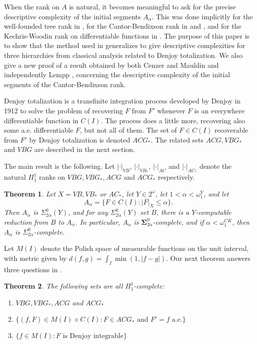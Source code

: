 \documentclass[12pt]{amsart}
\newtheorem{theorem}{Theorem}
\begin{document}
When the rank on $A$ is natural, 
it becomes meaningful to ask for the precise descriptive 
complexity of the initial segments $A_\alpha$.  This was done 
implicitly
for the well-founded tree rank in \cite{GreenbergMontalbanSlaman2013}, 
for the Cantor-Bendixson rank in {\cite{CenzerMauldin1983} and} 
\cite{Lempp}, and for the 
Kechris-Woodin rank on differentiable functions in \cite{Westrick2014}. 
The purpose of this paper is to show that the method used in 
\cite{Westrick2014} generalizes to give descriptive complexities for 
three hierarchies from classical analysis related to Denjoy 
totalization.  We also give a new proof of
a result obtained by both Cenzer and Mauldin \cite{CenzerMauldin1983} 
and independently Lempp \cite{Lempp}, concerning
the descriptive complexity of the initial segments of the 
Cantor-Bendixson rank.

Denjoy totalization is a transfinite integration process 
developed by Denjoy in 1912
to solve the problem of recovering $F$ from $F'$ whenever 
$F$ is an everywhere differentiable function in $C(I)$.  
The process does a little more, recovering also some a.e. differentiable 
$F$, but not all of them.  The set of $F \in C(I)$ 
recoverable from $F'$ by Denjoy totalization is denoted $ACG_\ast$. 
The related sets $ACG, VBG_\ast$ and $VBG$ are described in the 
next section.

The main result is the following.
Let $|\cdot|_{VB}$, $|\cdot|_{VB_\ast}$, 
$|\cdot|_{AC}$ and $|\cdot|_{AC_\ast}$ denote the natural 
$\Pi^1_1$ ranks on $VBG, VBG_\ast, ACG$ and $ACG_\ast$ 
respectively.
\begin{theorem}\label{thm:1}
Let $X = VB, VB_\ast$ or $AC_\ast$, let $Y \in 2^\omega$, 
let $1<\alpha < \omega_1^Y$, 
and let $$A_\alpha = \{F\in C(I) : |F|_X \leq \alpha\}.$$  Then
$A_\alpha$ is $\Sigma^0_{2\alpha}(Y)$, and for any 
$\Sigma^0_{2\alpha}(Y)$ set $B$, there is a $Y$-computable reduction from 
$B$ to $A_\alpha$.
In particular, $A_\alpha$ is $\mathbf \Sigma^0_{2\alpha}$-complete,
and if $\alpha< \omega_1^{CK}$, then $A_\alpha$ is $\Sigma^0_{2\alpha}$-complete.
\end{theorem}

Let $M(I)$ denote the Polish space of measurable functions on the unit 
interval, with metric given by $d(f,g) = \int_I \min(1,|f-g|)$. 
Our next theorem answers three questions in \cite{walsh}.
\begin{theorem}\label{thm:2}
The following sets are all $\Pi^1_1$-complete:
\begin{enumerate}
\item $VBG, VBG_\ast, ACG$ and $ACG_\ast$
\item $\{(f,F) \in M(I) \times C(I) : F \in ACG_\ast \text{ and } F'=f \text{ a.e.}\}$
\item $\{f \in M(I) : F \text{ is Denjoy integrable}\}$
\end{enumerate}
\end{theorem}
\end{document}
